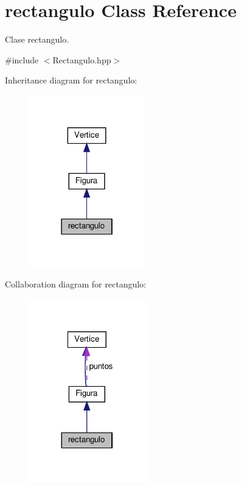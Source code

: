 \hypertarget{classrectangulo}{}\section{rectangulo Class Reference}
\label{classrectangulo}


Clase rectangulo.  




{\ttfamily \#include $<$Rectangulo.\+hpp$>$}



Inheritance diagram for rectangulo\+:
\nopagebreak
\begin{figure}[H]
\begin{center}
\leavevmode
\includegraphics[width=142pt]{classrectangulo__inherit__graph}
\end{center}
\end{figure}


Collaboration diagram for rectangulo\+:
\nopagebreak
\begin{figure}[H]
\begin{center}
\leavevmode
\includegraphics[width=144pt]{classrectangulo__coll__graph}
\end{center}
\end{figure}
